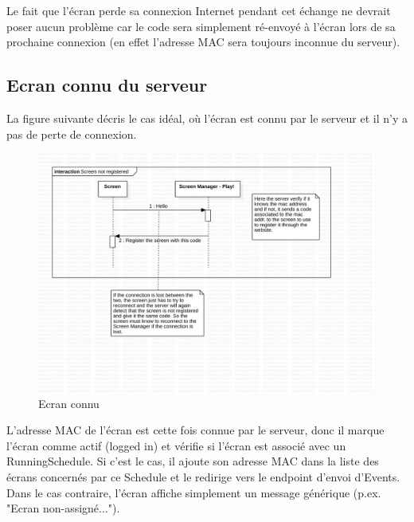 \documentclass[french]{article}
\begin{document}
	Le fait que l'écran perde sa connexion Internet pendant cet échange ne devrait poser aucun problème car le code sera simplement ré-envoyé à l'écran lors de sa prochaine connexion (en effet l'adresse MAC sera toujours inconnue du serveur). \newpage
	
\subsection{Ecran connu du serveur}
	La figure suivante décris le cas idéal, où l'écran est connu par le serveur et il n'y a pas de perte de connexion.
	\begin{figure}[h!]
		\centering
		\includegraphics[page={3}, scale=0.5]{protocol_v2}
		\caption{Ecran connu}
	\end{figure}			
	L'adresse MAC de l'écran est cette fois connue par le serveur, donc il marque l'écran comme actif (logged in) et vérifie si l'écran est associé avec un RunningSchedule. Si c'est le cas, il ajoute son adresse MAC dans la liste des écrans concernés par ce Schedule et le redirige vers le endpoint d'envoi d'Events. Dans le cas contraire, l'écran affiche simplement un message générique (p.ex. "Ecran non-assigné..."). \newpage
	
\end{document}
